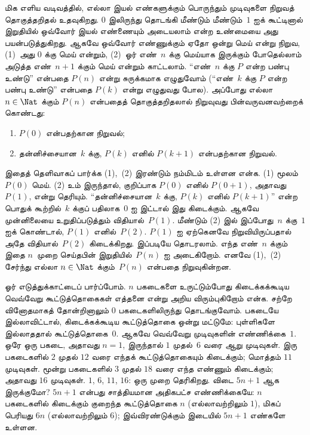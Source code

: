 \documentclass[../../../include/open-logic-section]{subfiles}
\begin{document}


மிக எளிய வடிவத்தில், எல்லா இயல் எண்களுக்கும்
பொருந்தும் முடிவுகளை நிறுவத் தொகுத்தறிதல் உதவுகிறது.
$0$ இலிருந்து தொடங்கி மீண்டும் மீண்டும்~$1$ ஐக்
கூட்டினால் இறுதியில் ஒவ்வோர் இயல் எண்ணையும் அடையலாம்
என்ற உண்மையை அது பயன்படுத்துகிறது. ஆகவே ஒவ்வோர்
எண்ணுக்கும் ஏதோ ஒன்று மெய் என்று நிறுவ, (1)~அது
$0$ க்கு மெய் என்றும், (2)~ஓர் எண்~$n$ க்கு
மெய்யாக இருக்கும் போதெல்லாம் அடுத்த எண்~$n+1$
க்கும் மெய் என்றும் காட்டலாம். ``எண்~$n$ க்கு
$P$ என்ற பண்பு உண்டு'' என்பதை $P(n)$ என்று
சுருக்கமாக எழுதுவோம் (``எண்~$k$ க்கு $P$
என்ற பண்பு உண்டு'' என்பதை $P(k)$ என்று
எழுதுவது போல). அப்போது எல்லா $n \in \Nat$
க்கும் $P(n)$ என்பதைத் தொகுத்தறிதலால் நிறுவுவது
பின்வருவனவற்றைக் கொண்டது:
\begin{enumerate}
\item $P(0)$ என்பதற்கான நிறுவல்;
\item தன்னிச்சையான~$k$ க்கு, $P(k)$ எனில்
      $P(k+1)$ என்பதற்கான நிறுவல்.
\end{enumerate}
இதைத் தெளிவாகப் பார்க்க (1),~(2) இரண்டும்
நம்மிடம் உள்ளன என்க. (1) மூலம் $P(0)$ மெய்.
(2) உம் இருந்தால், குறிப்பாக $P(0)$ எனில்
$P(0+1)$, அதாவது $P(1)$, என்று தெரியும்.
``தன்னிச்சையான~$k$ க்கு, $P(k)$ எனில்
$P(k+1)$'' என்ற பொதுக் கூற்றில்~$k$ க்குப்
பதிலாக~$0$ ஐ இட்டால் இது கிடைக்கும். ஆகவே
முன்னிலையை உறுதிப்படுத்தும் விதியால்~$P(1)$.
மீண்டும் (2) இல் இப்போது~$n$ க்கு~$1$
ஐக் கொண்டால், $P(1)$ எனில்~$P(2)$.
$P(1)$ ஐ ஏற்கெனவே நிறுவியிருப்பதால் அதே
விதியால்~$P(2)$ கிடைக்கிறது. இப்படியே தொடரலாம்.
எந்த எண்~$n$ க்கும் இதை $n$~முறை செய்தபின்
இறுதியில்~$P(n)$ ஐ அடைகிறோம். எனவே (1),~(2)
சேர்ந்து எல்லா $n \in \Nat$ க்கும்~$P(n)$
என்பதை நிறுவுகின்றன.

ஓர் எடுத்துக்காட்டைப் பார்ப்போம். $n$ பகடைகளை
உருட்டும்போது கிடைக்கக்கூடிய வெவ்வேறு கூட்டுத்தொகைகள்
எத்தனை என்று அறிய விரும்புகிறோம் என்க. சற்றே
வினோதமாகத் தோன்றினாலும் $0$ பகடைகளிலிருந்து
தொடங்குவோம். பகடையே இல்லாவிட்டால், கிடைக்கக்கூடிய
கூட்டுத்தொகை ஒன்று மட்டுமே: புள்ளிகளே இல்லாததால்
கூட்டுத்தொகை~$0$. ஆகவே வெவ்வேறு முடிவுகளின்
எண்ணிக்கை~$1$. ஒரே ஒரு பகடை, அதாவது $n=1$,
இருந்தால் $1$ முதல்~$6$ வரை ஆறு முடிவுகள்.
இரு பகடைகளில் $2$ முதல் $12$ வரை எந்தக்
கூட்டுத்தொகையும் கிடைக்கும்; மொத்தம் $11$ முடிவுகள்.
மூன்று பகடைகளில் $3$ முதல் $18$ வரை எந்த
எண்ணும் கிடைக்கும்; அதாவது $16$ முடிவுகள்.
$1$, $6$, $11$, $16$: ஒரு முறை தெரிகிறது.
விடை $5n+1$ ஆக இருக்குமோ? $5n+1$ என்பது
சாத்தியமான அதிகபட்ச எண்ணிக்கையே: $n$ பகடைகளில்
கிடைக்கும் குறைந்த கூட்டுத்தொகை $n$ (எல்லாவற்றிலும்
$1$), மிகப் பெரியது $6n$ (எல்லாவற்றிலும்
$6$); இவ்விரண்டுக்கும் இடையில் $5n+1$
எண்களே உள்ளன.
\end{document}
